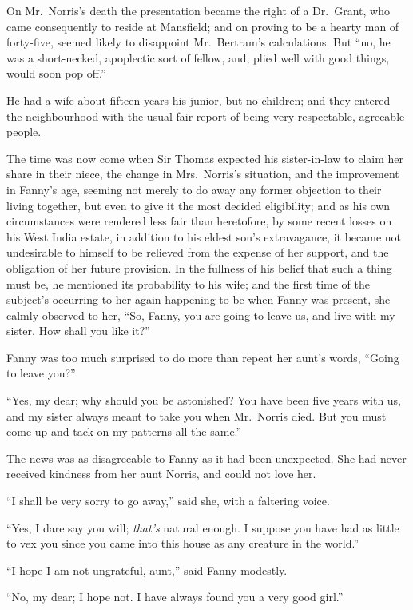 \documentclass{article}
\begin{document}
On Mr.\ Norris's death the presentation became the right of
a Dr.\ Grant, who came consequently to reside at Mansfield;
and on proving to be a hearty man of forty-five, seemed
likely to disappoint Mr.\ Bertram's calculations.
But ``no, he was a short-necked, apoplectic sort of fellow,
and, plied well with good things, would soon pop off.''

He had a wife about fifteen years his junior, but no children;
and they entered the neighbourhood with the usual fair
report of being very respectable, agreeable people.

The time was now come when Sir Thomas expected his
sister-in-law to claim her share in their niece,
the change in Mrs.\ Norris's situation, and the improvement
in Fanny's age, seeming not merely to do away any former
objection to their living together, but even to give it
the most decided eligibility; and as his own circumstances
were rendered less fair than heretofore, by some recent
losses on his West India estate, in addition to his eldest
son's extravagance, it became not undesirable to himself to be
relieved from the expense of her support, and the obligation
of her future provision.  In the fullness of his belief
that such a thing must be, he mentioned its probability
to his wife; and the first time of the subject's occurring
to her again happening to be when Fanny was present,
she calmly observed to her, ``So, Fanny, you are going
to leave us, and live with my sister.  How shall you like it?''

Fanny was too much surprised to do more than repeat
her aunt's words, ``Going to leave you?''

``Yes, my dear; why should you be astonished?
You have been five years with us, and my sister
always meant to take you when Mr.\ Norris died.
But you must come up and tack on my patterns all the same.''

The news was as disagreeable to Fanny as it had been unexpected.
She had never received kindness from her aunt Norris,
and could not love her.

``I shall be very sorry to go away,'' said she, with a
faltering voice.

``Yes, I dare say you will; \emph{that's} natural enough.
I suppose you have had as little to vex you since you came
into this house as any creature in the world.''

``I hope I am not ungrateful, aunt,'' said Fanny modestly.

``No, my dear; I hope not.  I have always found you
a very good girl.''
\end{document}
